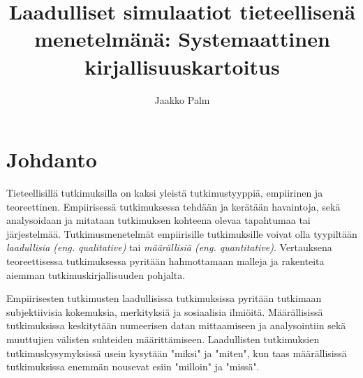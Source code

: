 \documentclass[utf8]{gradu3}
\begin{document}
\title{Laadulliset simulaatiot tieteellisenä menetelmänä: Systemaattinen kirjallisuuskartoitus}
\abstract{%
  
}

\author{Jaakko Palm}

\maketitle

\mainmatter

\chapter{Johdanto} \label{johdanto}
Tieteellisillä tutkimuksilla on kaksi yleistä tutkimustyyppiä, empiirinen ja teoreettinen.
Empiirisessä tutkimuksessa tehdään  ja kerätään havaintoja, sekä analysoidaan 
ja mitataan tutkimuksen kohteena olevaa tapahtumaa tai järjestelmää. 
Tutkimusmenetelmät empiirisille tutkimuksille voivat olla 
tyypiltään \textit{laadullisia (eng. qualitative)} 
tai \textit{määrällisiä (eng. quantitative)}. 
Vertauksena teoreettisessa tutkimuksessa pyritään hahmottamaan 
malleja ja rakenteita aiemman tutkimuskirjallisuuden pohjalta. 

Empiirisesten tutkimusten laadullisissa tutkimuksissa pyritään tutkimaan subjektiivisia kokemuksia, merkityksiä ja sosiaalisia ilmiöitä. Määrällisissä tutkimuksissa keskitytään
numeerisen datan mittaamiseen ja analysointiin sekä muuttujien välisten suhteiden määrittämiseen. 
Laadullisten tutkimuksien tutkimuskysymyksissä usein kysytään "miksi" ja "miten", 
kun taas määrällisissä tutkimuksissa enemmän nousevat esiin "milloin" ja "missä".
\end{document}
